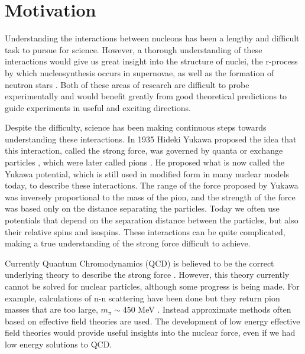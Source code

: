 \section{Motivation}
Understanding the interactions between nucleons has been a lengthy and difficult task to pursue for science. However, a thorough understanding of these interactions would give us great insight into the structure of nuclei, the r-process by which nucleosynthesis occurs in supernovae, as well as the formation of neutron stars \cite{lattimer2001,lattimer2004,stone2003,douchin2001,heiselberg2000}. Both of these areas of research are difficult to probe experimentally and would benefit greatly from good theoretical predictions to guide experiments in useful and exciting directions.

Despite the difficulty, science has been making continuous steps towards understanding these interactions. In 1935 Hideki Yukawa proposed the idea that this interaction, called the strong force, was governed by quanta or exchange particles \cite{yukawa1935}, which were later called pions \cite{lattes1947}. He proposed what is now called the Yukawa potential, which is still used in modified form in many nuclear models today, to describe these interactions. The range of the force proposed by Yukawa was inversely proportional to the mass of the pion, and the strength of the force was based only on the distance separating the particles. Today we often use potentials that depend on the separation distance between the particles, but also their relative spins and isospins. These interactions can be quite complicated, making a true understanding of the strong force difficult to achieve.

Currently Quantum Chromodynamics (QCD) is believed to be the correct underlying theory to describe the strong force \cite{kisslinger2016}. However, this theory currently cannot be solved for nuclear particles, although some progress is being made. For example, calculations of n-n scattering have been done but they return pion masses that are too large, $m_\pi \sim 450$ MeV \cite{savage2016}. Instead approximate methods often based on effective field theories are used. The development of low energy effective field theories would provide useful insights into the nuclear force, even if we had low energy solutions to QCD.


